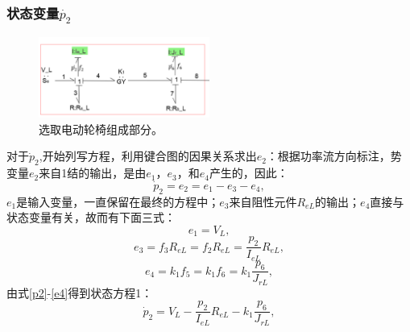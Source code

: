 \subsubsection{状态变量$\dot{ p_2 }$}
\begin{figure}[h]
	\centering
	\includegraphics[width=0.5\textwidth]{fig/equation1.png}
	\caption{选取电动轮椅组成部分。}\label{fig:equation1}
\end{figure}
对于$\dot{p} _ { 2 }$,开始列写方程，利用键合图的因果关系求出$e_2$：根据功率流方向标注，势变量$e_2$来自1结的输出，是由$e_1$，$e_3$，和$e_4$产生的，因此：
\begin{equation}\label{p2}
\dot{p} _ { 2 } = e _ { 2 } = e _ { 1 } - e _ { 3 } - e _ { 4 },
\end{equation}
$e_1$是输入变量，一直保留在最终的方程中；$e_3$来自阻性元件$R _ { eL }$的输出；$e_4$直接与状态变量有关，故而有下面三式：
\begin{equation}\label{e1}
e _ { 1} = V_L,
\end{equation}
\begin{equation}\label{e3}
e _ { 3 } = f _ { 3 } R _ { eL  }  = f _ { 2 } R _ { eL }  = \frac { p _ { 2 } } { I _ { eL } } R _ { eL},
\end{equation}
\begin{equation}\label{e4}
e _ { 4 } = k _ { 1 } f _ { 5 } = k _ { 1 } f _ { 6 } = k _ { 1 } \frac { p _ { 6 } } { J _ { r L}  },
\end{equation}
由式\ref{p2}-\ref{e4}得到状态方程1：
\begin{equation}
\dot { p } _ { 2 } = V _ {L}  - \frac { p _ { 2 } } { I _ { eL}  } R _ { eL} - k _ { 1 } \frac { p _ { 6 } } { J _ { rL} },
\end{equation}

